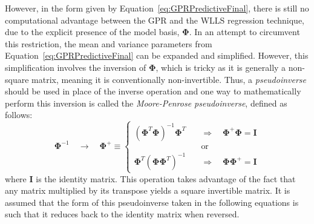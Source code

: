 \documentclass{article}
\begin{document}
However, in the form given by Equation~\eqref{eq:GPRPredictiveFinal}, there is still no computational advantage between the GPR and the WLLS regression technique, due to the explicit presence of the model basis, $\mathbf{\Phi}$. In an attempt to circumvent this restriction, the mean and variance parameters from Equation~\eqref{eq:GPRPredictiveFinal} can be expanded and simplified. However, this simplification involves the inversion of $\mathbf{\Phi}$, which is tricky as it is generally a non-square matrix, meaning it is conventionally non-invertible. Thus, a \emph{pseudoinverse} should be used in place of the inverse operation and one way to mathematically perform this inversion is called the \emph{Moore-Penrose pseudoinverse}, defined as follows:
\begin{equation}
\label{eq:MoorePenrosePseudoinverse}
	\mathbf{\Phi}^{-1} \quad \longrightarrow \quad \mathbf{\Phi}^+ \equiv \left\lbrace
	\begin{aligned}
	\left(\mathbf{\Phi}^T \mathbf{\Phi}\right)^{-1} \mathbf{\Phi}^T \quad &\Longrightarrow \quad \mathbf{\Phi}^+ \mathbf{\Phi} = \mathbf{I} \\
	&\text{or} \\
	\mathbf{\Phi}^T \left(\mathbf{\Phi} \mathbf{\Phi}^T\right)^{-1} \quad &\Longrightarrow \quad \mathbf{\Phi} \mathbf{\Phi}^+ = \mathbf{I}
	\end{aligned}
	\right.
\end{equation}
where $\mathbf{I}$ is the identity matrix. This operation takes advantage of the fact that any matrix multiplied by its transpose yields a square invertible matrix. It is assumed that the form of this pseudoinverse taken in the following equations is such that it reduces back to the identity matrix when reversed.
\end{document}
